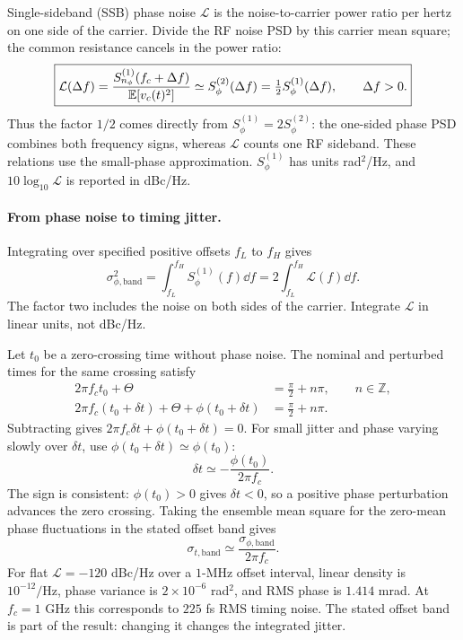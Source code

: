 Single-sideband (SSB) phase noise $\mathcal L$ is the noise-to-carrier power ratio per hertz on one side of the carrier. Divide the RF noise PSD by this carrier mean square; the common resistance cancels in the power ratio:
\begin{equation}
\boxed{\mathcal L(\Delta f)
=\frac{S_{n_\phi}^{(1)}(f_c+\Delta f)}{\mathbb E[v_c(t)^2]}
\simeq S_\phi^{(2)}(\Delta f)
=\tfrac12S_\phi^{(1)}(\Delta f),\qquad \Delta f>0.}
\end{equation}
Thus the factor $1/2$ comes directly from $S_\phi^{(1)}=2S_\phi^{(2)}$: the one-sided phase PSD combines both frequency signs, whereas $\mathcal L$ counts one RF sideband. These relations use the small-phase approximation. $S_\phi^{(1)}$ has units rad$^2$/Hz, and $10\log_{10}\mathcal L$ is reported in dBc/Hz.
\PhaseNoiseFigure

\paragraph{From phase noise to timing jitter.}
Integrating over specified positive offsets $f_L$ to $f_H$ gives
\[
\sigma_{\phi,\mathrm{band}}^2
=\int_{f_L}^{f_H}S_\phi^{(1)}(f)\dd f
=2\int_{f_L}^{f_H}\mathcal L(f)\dd f.
\]
The factor two includes the noise on both sides of the carrier. Integrate $\mathcal L$ in linear units, not dBc/Hz.

Let $t_0$ be a zero-crossing time without phase noise. The nominal and perturbed times for the same crossing satisfy
\begin{align*}
2\pi f_ct_0+\Theta&=\frac{\pi}{2}+n\pi,\qquad n\in\mathbb Z,\\
2\pi f_c(t_0+\delta t)+\Theta+\phi(t_0+\delta t)&=\frac{\pi}{2}+n\pi.
\end{align*}
Subtracting gives $2\pi f_c\delta t+\phi(t_0+\delta t)=0$. For small jitter and phase varying slowly over $\delta t$, use $\phi(t_0+\delta t)\simeq\phi(t_0)$:
\[
\boxed{\delta t\simeq-\frac{\phi(t_0)}{2\pi f_c}.}
\]
The sign is consistent: $\phi(t_0)>0$ gives $\delta t<0$, so a positive phase perturbation advances the zero crossing. Taking the ensemble mean square for the zero-mean phase fluctuations in the stated offset band gives
\[
\boxed{\sigma_{t,\mathrm{band}}\simeq
\frac{\sigma_{\phi,\mathrm{band}}}{2\pi f_c}.}
\]
For flat $\mathcal L=-120$ dBc/Hz over a $1$-MHz offset interval, linear density is $10^{-12}/\mathrm{Hz}$, phase variance is $2\times10^{-6}$ rad$^2$, and RMS phase is $1.414$ mrad. At $f_c=1$ GHz this corresponds to $225$ fs RMS timing noise. The stated offset band is part of the result: changing it changes the integrated jitter.

